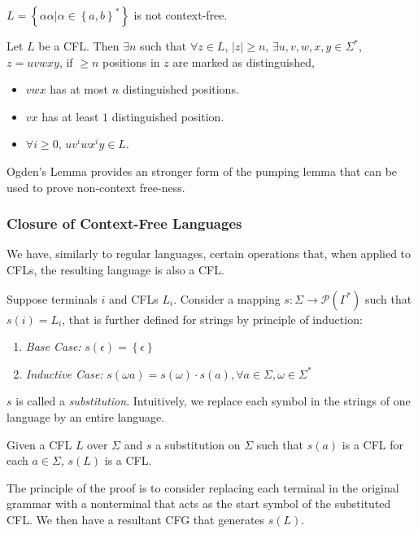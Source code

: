\begin{prop}
  $L=\left\{ \alpha\alpha|\alpha\in \left\{ a,b \right\} ^{*} \right\} $ is not
  context-free.
\end{prop}

\begin{lemma}
  Let $L$ be a CFL. Then $\exists n$ such that $\forall z\in L$, $\left| z
  \right| \ge n$, $\exists u,v,w,x,y\in \Sigma^{*}$, $z=uvwxy$, if $\ge n$ positions
  in $z$ are marked as distinguished,
  \begin{itemize}
    \item $vwx$ has at most $n$ distinguished positions.
    \item $vx$ has at least $1$ distinguished position.
    \item $\forall i\ge 0$, $uv^{i}wx^{i}y\in L$.
  \end{itemize}
\end{lemma}
Ogden's Lemma provides an stronger form of the pumping lemma that can be used
to prove non-context free-ness.

\subsubsection{Closure of Context-Free Languages}
We have, similarly to regular languages, certain operations that, when applied to CFLs,
the resulting language is also a CFL\@.

\begin{definition}[Substitution]
  Suppose terminals $i$ and CFLs $L_i$. Consider a mapping
  $s:\Sigma\to\mathcal{P}\left( \Gamma^{*} \right) $ such that $s(i)=L_i$, that
  is further defined for strings by principle of induction:
  \begin{enumerate}
    \item \textit{Base Case:} $s(\epsilon)=\left\{ \epsilon \right\}$
    \item \textit{Inductive Case:} $s(\omega a)=s(\omega)\cdot s(a), \forall a\in \Sigma,\omega\in \Sigma^{*}$
  \end{enumerate}
  $s$ is called a \textit{substitution}. Intuitively, we replace each symbol in the
  strings of one language by an entire language.
\end{definition}
\begin{theorem}
  Given a CFL $L$ over $\Sigma$ and $s$ a substitution on $\Sigma$ such that
  $s\left( a \right) $ is a CFL for each $a\in \Sigma$, $s\left( L \right) $ is
  a CFL.
\end{theorem}
The principle of the proof is to consider replacing each terminal in the
original grammar with a nonterminal that acts as the start symbol of the
substituted CFL. We then have a resultant CFG that generates $s\left( L \right)
$.\\

